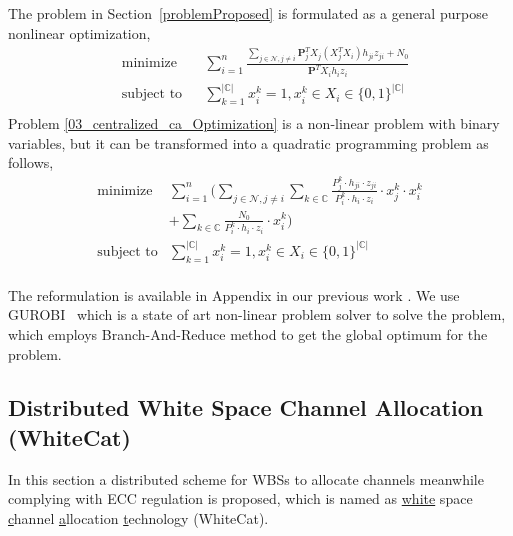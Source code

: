 \documentclass[times]{ettauth}
\theoremstyle{mytheoremstyle}
\theoremstyle{mytheoremstyle}
\theoremstyle{mytheoremstyle}
\renewcommand{\vec}[1]{\mathbf{#1}}
\begin{document}
The problem in Section~\ref{problemProposed} is formulated as a general purpose nonlinear optimization,
	\begin{equation}
\label{03_centralized_ca_Optimization}
		\begin{aligned}
		& \underset{}{\text{minimize}}
		& & \sum\limits^{n}_{i=1} \frac{\sum\limits_{j\in\mathcal{N}, j\neq i}\vec{P}_j^TX_j(X_j^TX_i)h_{ji}z_{ji} + N_0}{\vec{P}^TX_ih_iz_i}\\
		& \text{subject to}
		& & \sum\limits_{k=1}^{|\mathbb{C}|}x_i^k=1, x_i^k\in X_i\in \{0,1\}^{|\mathbb{C}|}\\
		\end{aligned}
	\end{equation}
Problem \ref{03_centralized_ca_Optimization} is a non-linear problem with binary variables, but it can be transformed into a quadratic programming problem as follows,
	\begin{equation}
\label{QLP_2}
			\begin{aligned}
			\underset{}{\text{minimize}}
			& \sum\limits^{n}_{i=1} ( \sum\limits_{j\in\mathcal{N}, j\neq i}\sum\limits_{k\in\mathbb{C}} \frac{P_j^k\cdot h_{ji}\cdot z_{ji}}{P_i^k\cdot h_i\cdot z_i}\cdot  x_j^k\cdot x_i^k  \\
			& + \sum\limits_{k\in\mathbb{C}} \frac{N_0}{P_i^k\cdot h_i\cdot z_i}\cdot x_i^k)\\
			\text{subject to} 
			& \sum\limits_{k=1}^{|\mathbb{C}|}x_i^k=1, x_i^k\in X_i\in \{0,1\}^{|\mathbb{C}|}\\
			\end{aligned}
		\end{equation}

The reformulation is available in Appendix in our previous work \cite{Li2012DistributedTS}.
We use GUROBI~\cite{gurobi} which is a state of art non-linear problem solver to solve the problem, which employs Branch-And-Reduce method to get the global optimum for the problem. %



\subsection{Distributed White Space Channel Allocation (WhiteCat)}
\label{whitecat}
In this section a distributed scheme for WBSs to allocate channels meanwhile complying with ECC regulation is proposed, which is named as \underline{white} space \underline{c}hannel \underline{a}llocation \underline{t}echnology (WhiteCat). 
\end{document}
